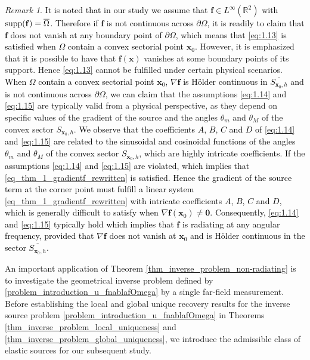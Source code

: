 \documentclass[11pt,reqno,oneside]{amsart}
\theoremstyle{definition}
\theoremstyle{remark}
\newtheorem{remark}{Remark}[section]
\numberwithin{equation}{section}
\numberwithin{equation}{section}
\theoremstyle{remark}
\begin{document}
\begin{remark}
	\textcolor{black}{It is noted that in our study we assume that $\mathbf f \in L^\infty(\mathbb R^2)$ with ${\rm supp}(\mathbf f)=\overline{\Omega}$. Therefore if $\mathbf f$ is not continuous across $\partial\Omega$, it is readily to claim that $\mathbf f$ does not vanish at any boundary point of $\partial \Omega$, which means that \eqref{eq:1.13} is satisfied when $\Omega$ contain a convex sectorial point $\mathbf x_0$.} However, it is emphasized that it is possible to have that $\mathbf{f}\left(\mathbf{x}\right) $ vanishes at some boundary points of its support. Hence \eqref{eq:1.13} cannot be fulfilled under certain physical scenarios. 	\textcolor{black}{When $\Omega$ contain a convex sectorial point $\mathbf x_0$, $\nabla \mathbf f $ is H\"older continuous in $\overline{S_{\mathbf x_0,h}}$ and is not continuous across $\partial \Omega$, we can claim that} the assumptions \eqref{eq:1.14} and \eqref{eq:1.15} are typically valid from a physical perspective, as they depend on specific values of the gradient of the source and the angles $\theta_m$ and $\theta_M$ of the convex sector $S_{\mathbf{x}_0,h}$. \textcolor{black}{We observe that the coefficients $A$, $B$, $C$ and $D$ of \eqref{eq:1.14} and \eqref{eq:1.15} are related to the sinusoidal and cosinoidal functions of the angles $\theta_m$ and $\theta_M$ of the convex sector $  S_{\mathbf{x}_0,h}  $, which are  highly intricate coefficients. If the assumptions \eqref{eq:1.14} and \eqref{eq:1.15} are violated, which implies that \eqref{eq_thm_1_gradientf_rewritten} is satisfied. Hence the gradient of the source term at the corner point must fulfill a linear system \eqref{eq_thm_1_gradientf_rewritten} with intricate coefficients  $A$, $B$, $C$ and $D$, which is generally difficult to satisfy when $ \nabla \mathbf{f}\left(\mathbf{x}_0\right) \neq \mathbf{0}$. Consequently, \eqref{eq:1.14} and \eqref{eq:1.15} typically hold  which implies that $ \mathbf{f} $ is radiating at any angular frequency, provided that $ \nabla \mathbf{f} $ does not vanish at $\mathbf{x}_0$ and is H\"older continuous in the sector $  \overline{S_{\mathbf{x}_0,h}}  $. }
\end{remark}


An important application of Theorem \ref{thm_inverse_problem_non-radiating} is to investigate the geometrical inverse problem defined by \eqref{problem_introduction_u_fnablafOmega} by a single far-field measurement.  Before establishing the local and global  unique recovery results for the inverse source problem \eqref{problem_introduction_u_fnablafOmega} in Theorems \ref{thm_inverse_problem_local_uniqueness} and \ref{thm_inverse_problem_global_uniqueness}, we introduce the admissible class of elastic sources for our subsequent study. 
\end{document}
